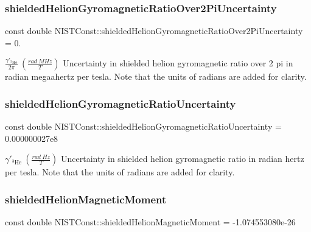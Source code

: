 \subsubsection{\texorpdfstring{shielded\+Helion\+Gyromagnetic\+Ratio\+Over2\+Pi\+Uncertainty}{shieldedHelionGyromagneticRatioOver2PiUncertainty}}
{\footnotesize\ttfamily const double N\+I\+S\+T\+Const\+::shielded\+Helion\+Gyromagnetic\+Ratio\+Over2\+Pi\+Uncertainty = 0.}

$\frac{\gamma'_{^3\textrm{He}}}{2 \pi} \ (\frac{rad\ MHz}{T})$ Uncertainty in shielded helion gyromagnetic ratio over 2 pi in radian megaahertz per tesla. Note that the units of radians are added for clarity. \mbox{\label{group___helion_ga2f3b1faa760be34cc23805484a9de01e}} 
\subsubsection{\texorpdfstring{shielded\+Helion\+Gyromagnetic\+Ratio\+Uncertainty}{shieldedHelionGyromagneticRatioUncertainty}}
{\footnotesize\ttfamily const double N\+I\+S\+T\+Const\+::shielded\+Helion\+Gyromagnetic\+Ratio\+Uncertainty = 0.\+000000027e8}

$\gamma'_{^3\textrm{He}} \ (\frac{rad\ Hz}{T})$ Uncertainty in shielded helion gyromagnetic ratio in radian hertz per tesla. Note that the units of radians are added for clarity. \mbox{\label{group___helion_ga1b0f92c14390afe726af4005e21c2ae8}} 
\subsubsection{\texorpdfstring{shielded\+Helion\+Magnetic\+Moment}{shieldedHelionMagneticMoment}}
{\footnotesize\ttfamily const double N\+I\+S\+T\+Const\+::shielded\+Helion\+Magnetic\+Moment = -\/1.\+074553080e-\/26}

